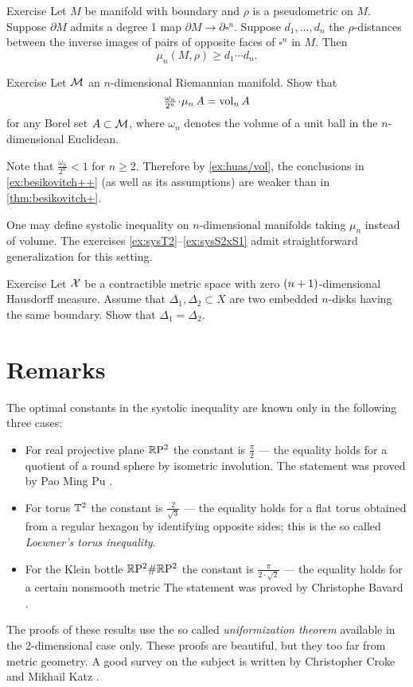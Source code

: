 \begin{thm}{Exercise}\label{ex:besikovitch++}
Let $M$ be manifold with boundary and $\rho$ is a pseudometric on $M$.
Suppose $\partial M$ admits a degree 1 map $\partial M\to\partial\square^n$. 
Suppose $d_1,\dots, d_n$ the $\rho$-distances between the inverse images of pairs of opposite faces of $\square^n$ in $M$.
Then 
\[\mu_n(M,\rho)\ge d_1\cdots d_n.\]
\end{thm}

\begin{thm}{Exercise}\label{ex:huas/vol}
Let $\mathcal{M}$ an $n$-dimensional Riemannian manifold.
Show that 
\[\tfrac{\omega_n}{2^n}\cdot\mu_n\,A=\vol_n A\]
for any Borel set $A\subset \mathcal{M}$, where $\omega_n$ denotes the volume of a unit ball in the $n$-dimensional Euclidean.
\end{thm}

Note that $\tfrac{\omega_n}{2^n}<1$ for $n\ge 2$.
Therefore by \ref{ex:huas/vol}, the conclusions in \ref{ex:besikovitch++} (as well as its assumptions) are weaker than in \ref{thm:besikovitch+}.

One may define systolic inequality on $n$-dimensional manifolds taking $\mu_n$ instead of volume. 
The exercises \ref{ex:sysT2}--\ref{ex:sysS2xS1} admit straightforward generalization for this setting.

\begin{thm}{Exercise}\label{ex:2top-discs}
Let $\mathcal{X}$ be a contractible metric space with zero $(n\z+1)$-dimensional Hausdorff measure.
Assume that $\Delta_1,\Delta_2\subset X$ are two embedded $n$-disks having the same boundary.
Show that $\Delta_1=\Delta_2$.
\end{thm}

\section{Remarks}

The optimal constants in the systolic inequality are known only in the following three cases:
\begin{itemize}
\item For real projective plane $\mathbb{R}\mathrm{P}^2$ the constant is $\tfrac\pi2$ --- the equality holds for a quotient of a round sphere by isometric involution. The statement was proved by Pao Ming Pu \cite{pu}.\label{page:pu}
\item For torus $\mathbb{T}^2$ the constant is $\tfrac2{\sqrt{3}}$ --- the equality holds for a flat torus obtained from a regular hexagon by identifying opposite sides; this is the so called \emph{Loewner's torus inequality}.
\item For the Klein bottle $\mathbb{R}\mathrm{P}^2\#\mathbb{R}\mathrm{P}^2$  the constant is $\tfrac\pi{2\cdot\sqrt2}$ --- the equality holds for a certain nonsmooth metric The statement was proved by Christophe Bavard \cite{bavard}.
\end{itemize}
The proofs of these results use the so called {}\emph{uniformization theorem}   available in the 2-dimensional case only.
These proofs are beautiful, but they too far from metric geometry.
A good survey on the subject is written by Christopher Croke and Mikhail Katz \cite{croke-katz}.

